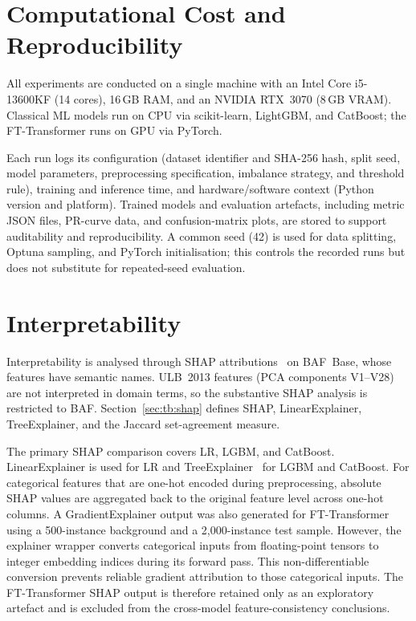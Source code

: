 \section{Computational Cost and Reproducibility}
\label{sec:reproducibility}

All experiments are conducted on a single machine with an Intel Core i5-13600KF (14 cores), 16\,GB RAM, and an NVIDIA RTX~3070 (8\,GB VRAM). Classical ML models run on CPU via scikit-learn, LightGBM, and CatBoost; the FT-Transformer runs on GPU via PyTorch.

Each run logs its configuration (dataset identifier and SHA-256 hash, split seed, model parameters, preprocessing specification, imbalance strategy, and threshold rule), training and inference time, and hardware/software context (Python version and platform). Trained models and evaluation artefacts, including metric JSON files, PR-curve data, and confusion-matrix plots, are stored to support auditability and reproducibility. A common seed (42) is used for data splitting, Optuna sampling, and PyTorch initialisation; this controls the recorded runs but does not substitute for repeated-seed evaluation.

\section{Interpretability}
\label{sec:interpretability}

Interpretability is analysed through SHAP attributions~\cite{lundberg2017unified} on BAF~Base, whose features have semantic names. ULB~2013 features (PCA components V1--V28) are not interpreted in domain terms, so the substantive SHAP analysis is restricted to BAF. Section~\ref{sec:tb:shap} defines SHAP, LinearExplainer, TreeExplainer, and the Jaccard set-agreement measure.

The primary SHAP comparison covers LR, LGBM, and CatBoost. LinearExplainer is used for LR and TreeExplainer~\cite{lundberg2020local} for LGBM and CatBoost. For categorical features that are one-hot encoded during preprocessing, absolute SHAP values are aggregated back to the original feature level across one-hot columns. A GradientExplainer output was also generated for FT-Transformer using a 500-instance background and a 2,000-instance test sample. However, the explainer wrapper converts categorical inputs from floating-point tensors to integer embedding indices during its forward pass. This non-differentiable conversion prevents reliable gradient attribution to those categorical inputs. The FT-Transformer SHAP output is therefore retained only as an exploratory artefact and is excluded from the cross-model feature-consistency conclusions.

